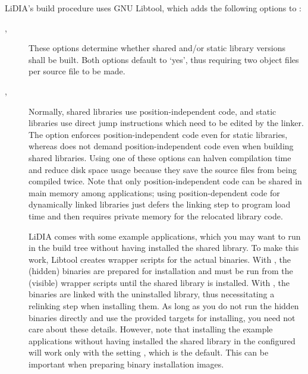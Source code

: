 LiDIA's build procedure uses GNU Libtool, which adds the following 
options to :

\begin{description}
\item[, ]
  These options determine whether shared and/or static library versions
  shall be built.  Both options default to `yes', thus requiring two object
  files per source file to be made.

\item[, ]
  Normally, shared libraries use position-independent code, and static
  libraries use direct jump instructions which need to be edited by the
  linker.  The  option enforces position-independent code
  even for static libraries, whereas  does not demand
  position-independent code even when building shared libraries.  Using one
  of these options can halven compilation time and reduce disk space usage
  because they save the source files from being compiled twice.  Note that
  only position-independent code can be shared in main memory among
  applications; using position-dependent code for dynamically linked
  libraries just defers the linking step to program load time and then
  requires private memory for the relocated library code.

\item[]
  LiDIA comes with some example applications, which you may want to run in
  the build tree without having installed the shared library.  To make this
  work, Libtool creates wrapper scripts for the actual binaries.  With
  , the (hidden) binaries are prepared for
  installation and must be run from the (visible) wrapper scripts until the
  shared library is installed.  With , the
  binaries are linked with the uninstalled library, thus necessitating a
  relinking step when installing them.  As long as you do not run the hidden
  binaries directly and use the provided  targets for installing,
  you need not care about these details.  However, note that installing the
  example applications without having installed the shared library in the
  configured  will work only with the setting
  , which is the default.  This can be
  important when preparing binary installation images.
\end{description}


